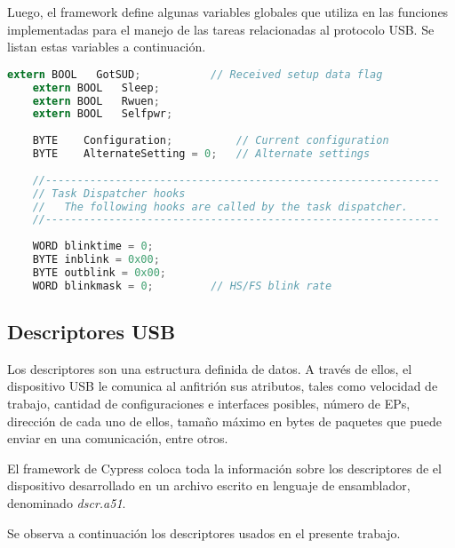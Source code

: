 	Luego, el framework define algunas variables globales que utiliza en las funciones implementadas para el manejo de las tareas relacionadas al protocolo USB. Se listan estas variables a continuación.
	
	\begin{lstlisting}[language=C,backgroundcolor=\color{gray!30}]
	extern BOOL   GotSUD;			// Received setup data flag
	extern BOOL   Sleep;
	extern BOOL   Rwuen;
	extern BOOL   Selfpwr;
	
	BYTE    Configuration;      	// Current configuration
	BYTE    AlternateSetting = 0;   // Alternate settings
	
	//--------------------------------------------------------------
	// Task Dispatcher hooks
	//   The following hooks are called by the task dispatcher.
	//--------------------------------------------------------------
	
	WORD blinktime = 0;
	BYTE inblink = 0x00;
	BYTE outblink = 0x00;
	WORD blinkmask = 0;			// HS/FS blink rate
	\end{lstlisting}
	
\subsection{Descriptores USB}	
	Los descriptores son una estructura definida de datos. A través de ellos, el dispositivo USB le comunica al anfitrión sus atributos, tales como velocidad de trabajo, cantidad de configuraciones e interfaces posibles, número de EPs, dirección de cada uno de ellos, tamaño máximo en bytes de paquetes que puede enviar en una comunicación, entre otros.%
	
	El framework de Cypress coloca toda la información sobre los descriptores de el dispositivo desarrollado en un archivo escrito en lenguaje de ensamblador, denominado {\it dscr.a51}.%
	
	Se observa a continuación los descriptores usados en el presente trabajo.%



%	
